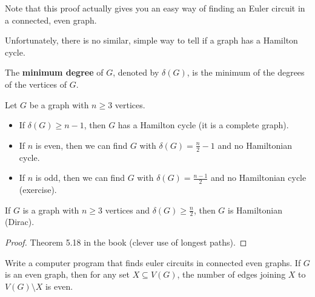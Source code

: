 Note that this proof actually gives you an easy way of finding an Euler circuit in a connected, even graph. \par

Unfortunately, there is no similar, simple way to tell if a graph has a Hamilton cycle.

\begin{definition}
	The \textbf{minimum degree} of \( G \), denoted by \( \delta(G) \), is the minimum of the degrees of the vertices of \( G \).
\end{definition}


\begin{property}
	Let \( G \) be a graph with \( n \ge 3 \) vertices.
	\begin{itemize}
		\item If \( \delta(G) \ge n - 1 \), then \( G \) has a Hamilton cycle (it is a complete graph).
		\item If \( n \) is even, then we can find \( G \) with \( \delta(G) = \frac{n}{2} - 1 \) and no Hamiltonian cycle.
		\item If \( n \) is odd, then we can find \( G \) with \( \delta(G) = \frac{n-1}{2} \) and no Hamiltonian cycle (exercise).
	\end{itemize}
\end{property}

\begin{theorem}
	If \( G \) is a graph with \( n \ge 3 \) vertices and \( \delta(G) \ge \frac{n}{2} \), then \( G \) is Hamiltonian (Dirac).
\end{theorem}
\begin{proof}
	Theorem 5.18 in the book (clever use of longest paths).
\end{proof}

Write a computer program that finds euler circuits in connected even graphs.
If \( G \) is an even graph, then for any set \( X \subseteq V(G) \), the number of edges joining \( X \) to \( V(G)\setminus X \) is even.
